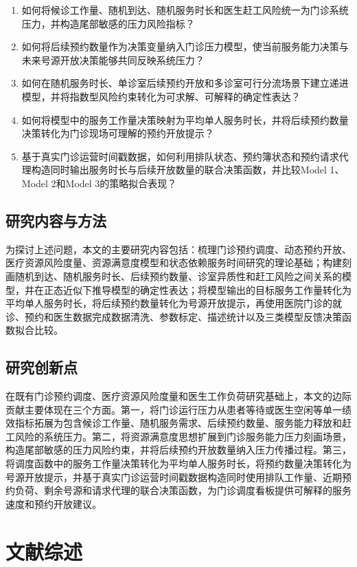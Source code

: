\documentclass[a4paper,zihao=-4]{ctexart}
\numberwithin{figure}{section}
\numberwithin{table}{section}
\begin{document}
\begin{enumerate}
  \item 如何将候诊工作量、随机到达、随机服务时长和医生赶工风险统一为门诊系统压力，并构造尾部敏感的压力风险指标？
  \item 如何将后续预约数量作为决策变量纳入门诊压力模型，使当前服务能力决策与未来号源开放决策能够共同反映系统压力？
  \item 如何在随机服务时长、单诊室后续预约开放和多诊室可行分流场景下建立递进模型，并将指数型风险约束转化为可求解、可解释的确定性表达？
  \item 如何将模型中的服务工作量决策映射为平均单人服务时长，并将后续预约数量决策转化为门诊现场可理解的预约开放提示？
  \item 基于真实门诊运营时间戳数据，如何利用排队状态、预约簿状态和预约请求代理构造同时输出服务时长与后续开放数量的联合决策函数，并比较Model 1、Model 2和Model 3的策略拟合表现？
\end{enumerate}

\subsection{研究内容与方法}

为探讨上述问题，本文的主要研究内容包括：梳理门诊预约调度、动态预约开放、医疗资源风险度量、资源满意度模型和状态依赖服务时间研究的理论基础；构建刻画随机到达、随机服务时长、后续预约数量、诊室异质性和赶工风险之间关系的模型，并在正态近似下推导模型的确定性表达；将模型输出的目标服务工作量转化为平均单人服务时长，将后续预约数量转化为号源开放提示，再使用医院门诊的就诊、预约和医生数据完成数据清洗、参数标定、描述统计以及三类模型反馈决策函数拟合比较。

\subsection{研究创新点}

在既有门诊预约调度、医疗资源风险度量和医生工作负荷研究基础上，本文的边际贡献主要体现在三个方面。第一，将门诊运行压力从患者等待或医生空闲等单一绩效指标拓展为包含候诊工作量、随机服务需求、后续预约数量、服务能力释放和赶工风险的系统压力。第二，将资源满意度思想扩展到门诊服务能力压力刻画场景，构造尾部敏感的压力风险约束，并将后续预约开放数量纳入压力传播过程。第三，将调度函数中的服务工作量决策转化为平均单人服务时长，将预约数量决策转化为号源开放提示，并基于真实门诊运营时间戳数据构造同时使用排队工作量、近期预约负荷、剩余号源和请求代理的联合决策函数，为门诊调度看板提供可解释的服务速度和预约开放建议。

\section{文献综述}
\end{document}
